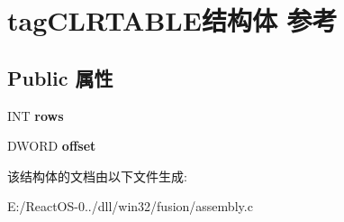 \hypertarget{structtag_c_l_r_t_a_b_l_e}{}\section{tag\+C\+L\+R\+T\+A\+B\+L\+E结构体 参考}
\label{structtag_c_l_r_t_a_b_l_e}
\subsection*{Public 属性}
\begin{DoxyCompactItemize}
\item 
\mbox{\label{structtag_c_l_r_t_a_b_l_e_a4d9c2a64932db59055a59861b618698b}} 
I\+NT {\bfseries rows}
\item 
\mbox{\label{structtag_c_l_r_t_a_b_l_e_a24dc8492ed864ca93d10eedee563a9ec}} 
D\+W\+O\+RD {\bfseries offset}
\end{DoxyCompactItemize}


该结构体的文档由以下文件生成\+:\begin{DoxyCompactItemize}
\item 
E\+:/\+React\+O\+S-\/0../dll/win32/fusion/assembly.\+c\end{DoxyCompactItemize}
